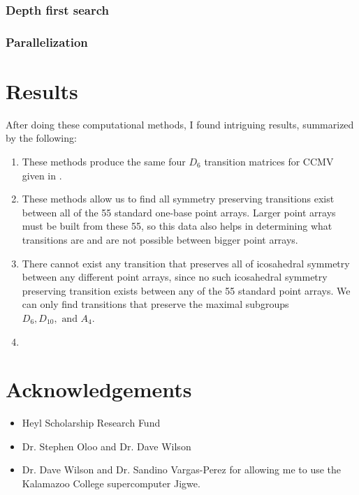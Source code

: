 \documentclass[a4paper,10pt]{article}
\theoremstyle{plain}
\theoremstyle{definition}
\theoremstyle{remark}
\begin{document}
\subsubsection{Depth first search}
\subsubsection{Parallelization}

\section{Results}
After doing these computational methods, I found intriguing results, summarized by the following:
\begin{enumerate}
	\item These methods produce the same four \( D_6 \) transition matrices for CCMV given in \cite{indelicatoetal2012}.
	
	\item These methods allow us to find all symmetry preserving transitions exist between all of the 55 standard one-base point arrays. Larger point arrays must be built from these 55, so this data also helps in determining what transitions are and are not possible between bigger point arrays.
	
	\item There cannot exist any transition that preserves all of icosahedral symmetry between any different point arrays, since no such icosahedral symmetry preserving transition exists between any of the 55 standard point arrays.
	We can only find transitions that preserve the maximal subgroups \(D_6, D_{10}, \text{ and } A_4\).
	
	\item {}
\end{enumerate}

\section{Acknowledgements}
\begin{itemize}
	\item Heyl Scholarship Research Fund
	\item Dr. Stephen Oloo and Dr. Dave Wilson
	\item Dr. Dave Wilson and Dr. Sandino Vargas-Perez for allowing me to use the Kalamazoo College supercomputer Jigwe.
\end{itemize}


\medskip

\end{document}
